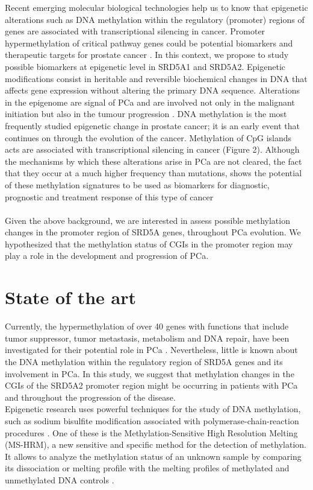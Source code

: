 \documentclass[a4paper,11pt]{article}
\begin{document}
Recent emerging molecular biological technologies help us to know that epigenetic alterations such as DNA methylation within the regulatory (promoter) regions of genes are associated with transcriptional silencing in cancer. Promoter hypermethylation of critical pathway genes could be potential biomarkers and therapeutic targets for prostate cancer \cite{Yang2012}.
In this context, we propose to study possible biomarkers at epigenetic level in SRD5A1 and SRD5A2. Epigenetic modifications consist in heritable and reversible biochemical changes in DNA that affects gene expression without altering the primary DNA sequence. Alterations in the epigenome are signal of PCa and are involved not only in the malignant initiation but also in the tumour progression \cite{Goering2012}. DNA methylation is the most frequently studied epigenetic change in prostate cancer; it is an early event that continues on through the evolution of the cancer. Methylation of CpG islands acts are associated with transcriptional silencing in cancer (Figure 2). Although the mechanisms by which these alterations arise in PCa are not cleared, the fact that they occur at a much higher frequency than mutations, shows the potential of these methylation signatures to be used as biomarkers for diagnostic, prognostic and treatment response of this type of cancer \cite{Strand2014, Yang2012}  \\ \\ Given the above background, we are interested in assess possible methylation changes in the promoter region of SRD5A genes, throughout PCa evolution. We hypothesized that the methylation status of CGIs in the promoter region may play a role in the development and progression of PCa. 

\section{State of the art}

Currently, the hypermethylation of over 40 genes with functions that include tumor suppressor, tumor metastasis, metabolism and DNA repair, have been investigated for their potential role in PCa \cite{Steers2001}. Nevertheless, little is known about the DNA methylation within the regulatory region of SRD5A genes and its involvement in PCa. In this study, we suggest that methylation changes in the CGIs of the SRD5A2 promoter region might be occurring in patients with PCa and throughout the progression of the disease. \\ Epigenetic research uses powerful techniques for the study of DNA methylation, such as sodium bisulfite modification associated with polymerase-chain-reaction procedures \cite{Jeronimo2011}. One of these is the Methylation-Sensitive High Resolution Melting (MS-HRM), a new sensitive and specific method for the detection of methylation. It allows to analyze the methylation status of an unknown sample by comparing its dissociation or melting profile with the melting profiles of methylated and unmethylated DNA controls \cite{Wojdacz2007, Wojdacz2010}. 
\end{document}
